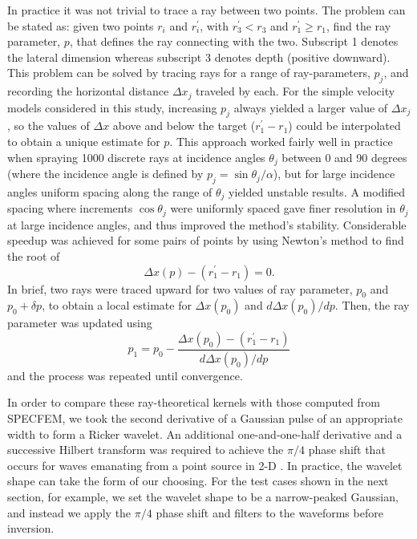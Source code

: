 \documentclass[referee]{gji}
\begin{document}
In practice it was not trivial to trace a ray between two points.  The problem can be stated as: given two points $r_{i}$ and $r^\prime_{i}$, with $r^\prime_{3}<r_{3}$ and $r^\prime_{1} \ge r_{1}$, find the ray parameter, $p$, that defines the ray connecting with the two.  Subscript 1 denotes the lateral dimension whereas subscript 3 denotes depth (positive downward).  This problem can be solved by tracing rays for a range of ray-parameters, $p_j$, and recording the horizontal distance $\Delta x_j$ traveled by each.  For the simple velocity models considered in this study, increasing $p_j$ always yielded a larger value of $\Delta x_j$, so the values of $\Delta x$ above and below the target ($r^\prime_1-r_1$) could be interpolated to obtain a unique estimate for $p$.  This approach worked fairly well in practice when spraying 1000 discrete rays at incidence angles $\theta_j$ between 0 and 90 degrees (where the incidence angle is defined by $p_j=\sin{\theta_j}/\alpha$), but for large incidence angles uniform spacing along the range of $\theta_j$ yielded unstable results.  A modified spacing where increments $\cos{\theta_j}$ were uniformly spaced gave finer resolution in $\theta_j$ at large incidence angles, and thus improved the method's stability. Considerable speedup was achieved for some pairs of points by using Newton's method to find the root of
\begin{equation}
\Delta x (p) - (r^\prime_1-r_1) = 0 .
\end{equation}
In brief, two rays were traced upward for two values of ray parameter, $p_0$ and $p_0+\delta p$, to obtain a local estimate for $\Delta x (p_0)$  and $d \Delta x (p_0) / dp$.
Then, the ray parameter was updated using
\begin{equation}
p_{1}=p_0-\frac{\Delta x (p_0)-(r^\prime_1-r_1)}{ d \Delta x (p_0) / d p}
\end{equation}
and the process was repeated until convergence.

In order to compare these ray-theoretical kernels with those computed from SPECFEM, we took the second derivative of a Gaussian pulse of an appropriate width to form a Ricker wavelet.  An additional one-and-one-half derivative and a successive Hilbert transform was required to achieve the $\pi/4$ phase shift that occurs for waves emanating from a point source in 2-D \citep{Hudson1980, Bostock1999}.  In practice, the wavelet shape can take the form of our choosing.  For the test cases shown in the next section, for example, we set the wavelet shape to be a narrow-peaked Gaussian, and instead we apply the $\pi/4$ phase shift and filters to the waveforms before inversion.
\end{document}
